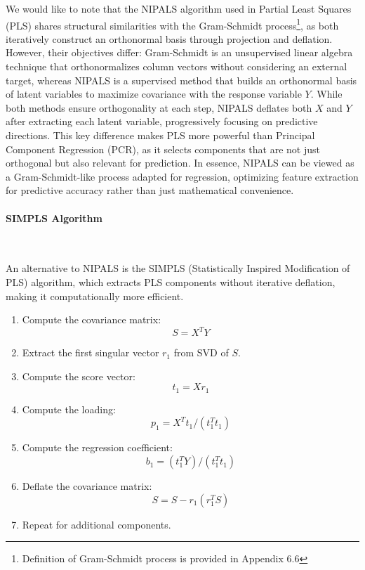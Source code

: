 \documentclass[11pt,twoside,a4paper]{article}
\begin{document}
We would like to note that the NIPALS algorithm used in Partial Least Squares (PLS) shares structural similarities with the Gram-Schmidt process\footnote{Definition of Gram-Schmidt process is provided in Appendix 6.6}, as both iteratively construct an orthonormal basis through projection and deflation. However, their objectives differ: Gram-Schmidt is an unsupervised linear algebra technique that orthonormalizes column vectors without considering an external target, whereas NIPALS is a supervised method that builds an orthonormal basis of latent variables to maximize covariance with the response variable \( Y \). While both methods ensure orthogonality at each step, NIPALS deflates both \( X \) and \( Y \) after extracting each latent variable, progressively focusing on predictive directions. This key difference makes PLS more powerful than Principal Component Regression (PCR), as it selects components that are not just orthogonal but also relevant for prediction. In essence, NIPALS can be viewed as a Gram-Schmidt-like process adapted for regression, optimizing feature extraction for predictive accuracy rather than just mathematical convenience.

\paragraph {SIMPLS Algorithm} \ \

An alternative to NIPALS is the SIMPLS (Statistically Inspired Modification of PLS) algorithm, which extracts PLS components without iterative deflation, making it computationally more efficient.

\begin{enumerate}
    \item Compute the covariance matrix:
        \begin{equation}
        S = X^T Y
        \end{equation}
    \item Extract the first singular vector \( r_1 \) from SVD of \( S \).
    \item Compute the score vector:
        \begin{equation}
        t_1 = Xr_1
        \end{equation}
    \item Compute the loading:
        \begin{equation}
        p_1 = X^T t_1 / (t_1^T t_1)
        \end{equation}
    \item Compute the regression coefficient:
        \begin{equation}
        b_1 = (t_1^T Y) / (t_1^T t_1)
        \end{equation}
    \item Deflate the covariance matrix:
        \begin{equation}
        S = S - r_1 (r_1^T S)
        \end{equation}
    \item Repeat for additional components.
\end{enumerate}
\end{document}
